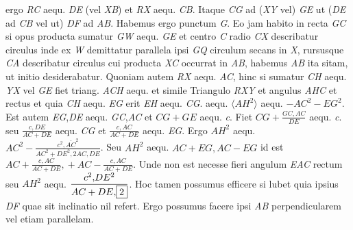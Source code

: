 ergo \textit{RC} aequ. \textit{DE} (vel \textit{XB}) et \textit{RX} aequ. \textit{CB}. Itaque \textit{CG} ad (\textit{XY} vel) \textit{GE} ut (\textit{DE} ad \textit{CB} vel ut) \textit{DF} ad \textit{AB}. Habemus ergo punctum \textit{G}. 
\pend
\pstart
Eo jam habito in recta \textit{GC} si opus producta sumatur \textit{GW} aequ. \textit{GE} et centro \textit{C} radio \textit{CX} describatur circulus inde ex \textit{W} demittatur parallela ipsi \textit{GQ} circulum secans in \textit{X}, rursusque 
\textit{CA} describatur circulus cui producta \textit{XC} occurrat in \textit{AB},
habemus \textit{AB} ita sitam, ut initio desiderabatur. Quoniam autem \textit{RX} aequ. \textit{AC}, hinc si sumatur \textit{CH} aequ. \textit{YX} vel \textit{GE} fiet triang. \textit{ACH} aequ. et simile Triangulo
\textit{RXY} et angulus \textit{AHC} et rectus et quia \textit{CH} aequ. \textit{EG} erit \textit{EH} aequ. \textit{CG}. 
aequ. $\langle AH^2\rangle$ aequ. $-AC^2-EG^2$. 
\pend
\pstart
Est autem \textit{EG},\textit{DE} aequ. \textit{GC},\textit{AC} et $CG+GE$ aequ. \textit{c}.
Fiet $CG+\displaystyle\frac{GC,\!AC}{DE}$ aequ. \textit{c}. seu $\displaystyle\frac{c,\!DE}{AC+DE}$ aequ. \textit{CG} et $\displaystyle\frac{c,\!AC}{AC+DE}$ aequ. \textit{EG}.
Ergo $AH^2$ aequ. $AC^2-\displaystyle\frac{c^2,\!\overline{AC}^2}{AC^2+DE^2,\!2AC,\!DE}$.
Seu $AH^2$ aequ. $AC\!+\!EG,AC\!-\!EG$ id est $AC+\displaystyle\frac{c,\!AC}{AC+DE},\!+AC-\displaystyle\frac{c,\!AC}{AC+DE}$.
Unde non est necesse fieri angulum \textit{EAC} rectum seu $AH^2$ aequ. $\displaystyle\frac{c^2,\!DE^2}{AC+DE,\!\framebox{$2$}}$.%
Hoc tamen possumus efficere si lubet quia ipsius \textit{DF} quae sit inclinatio nil refert. Ergo possumus facere ipsi \textit{AB} perpendicularem vel etiam parallelam. \pend 
